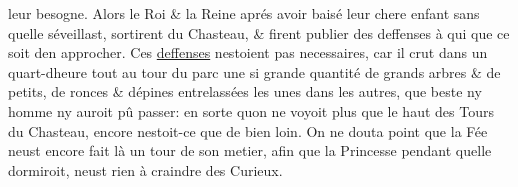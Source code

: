 \documentclass[14pt,a4paper]{memoir}
\newcommand{\ul}[1]{\uline{#1}}
\begin{document}
\begin{otherlanguage}{french}
leur besogne. Alors le Roi \& la Reine aprés avoir baisé leur chere
enfant sans qu\textquotesingle elle s\textquotesingle éveillast,
sortirent du Chasteau, \& firent publier des deffenses à qui que ce soit
d\textquotesingle en approcher. Ces \ul{deffenses}
n\textquotesingle estoient pas necessaires, car il crut dans un
quart-d\textquotesingle heure tout au tour du parc une si grande
quantité de grands arbres \& de petits, de ronces \&
d\textquotesingle épines entrelassées les unes dans les autres, que
beste ny homme n\textquotesingle y auroit pû passer: en sorte
qu\textquotesingle on ne voyoit plus que le haut des Tours du Chasteau,
encore n\textquotesingle estoit-ce que de bien loin. On ne douta point
que la Fée n\textquotesingle eust encore fait là un tour de son metier,
afin que la Princesse pendant qu\textquotesingle elle dormiroit,
n\textquotesingle eust rien à craindre des Curieux.


\end{otherlanguage}
\end{document}
